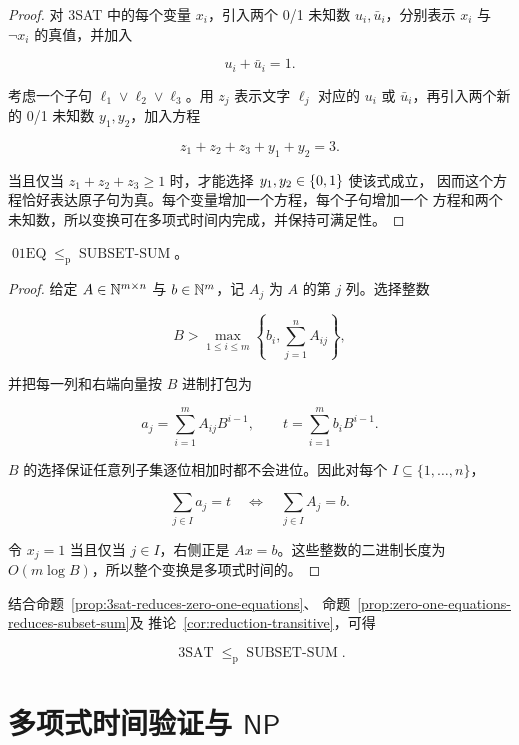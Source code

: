 \begin{proof}
  对 3SAT 中的每个变量 $x_i$，引入两个 0/1 未知数 $u_i,\bar u_i$，分别表示
  $x_i$ 与 $\lnot x_i$ 的真值，并加入

  \[
    u_i+\bar u_i=1.
  \]

  考虑一个子句 $\ell_1\lor\ell_2\lor\ell_3$。用 $z_j$ 表示文字
  $\ell_j$ 对应的 $u_i$ 或 $\bar u_i$，再引入两个新的 0/1 未知数
  $y_1,y_2$，加入方程

  \[
    z_1+z_2+z_3+y_1+y_2=3.
  \]

  当且仅当 $z_1+z_2+z_3\geq1$ 时，才能选择 $y_1,y_2\in\{0,1\}$ 使该式成立，
  因而这个方程恰好表达原子句为真。每个变量增加一个方程，每个子句增加一个
  方程和两个未知数，所以变换可在多项式时间内完成，并保持可满足性。
\end{proof}

\begin{proposition}
  \label{prop:zero-one-equations-reduces-subset-sum}
  $\operatorname{01EQ}\leq_{\mathrm p}\operatorname{SUBSET\text{-}SUM}$。
\end{proposition}

\begin{proof}
  给定 $A\in\mathbb{N}^{m\times n}$ 与 $b\in\mathbb{N}^m$，记 $A_j$ 为 $A$ 的第 $j$
  列。选择整数

  \[
    B>\max_{1\leq i\leq m}
      \left\{b_i,\sum_{j=1}^n A_{ij}\right\},
  \]

  并把每一列和右端向量按 $B$ 进制打包为

  \[
    a_j=\sum_{i=1}^m A_{ij}B^{i-1},
    \qquad
    t=\sum_{i=1}^m b_iB^{i-1}.
  \]

  $B$ 的选择保证任意列子集逐位相加时都不会进位。因此对每个
  $I\subseteq\{1,\ldots,n\}$，

  \[
    \sum_{j\in I}a_j=t
    \quad\Longleftrightarrow\quad
    \sum_{j\in I}A_j=b.
  \]

  令 $x_j=1$ 当且仅当 $j\in I$，右侧正是 $Ax=b$。这些整数的二进制长度为
  $O(m\log B)$，所以整个变换是多项式时间的。
\end{proof}

结合命题~\ref{prop:3sat-reduces-zero-one-equations}、
命题~\ref{prop:zero-one-equations-reduces-subset-sum}及
推论~\ref{cor:reduction-transitive}，可得

\[
  \operatorname{3SAT}
    \leq_{\mathrm p}\operatorname{SUBSET\text{-}SUM}.
\]

\section{多项式时间验证与 \texorpdfstring{$\mathsf{NP}$}{NP}}

